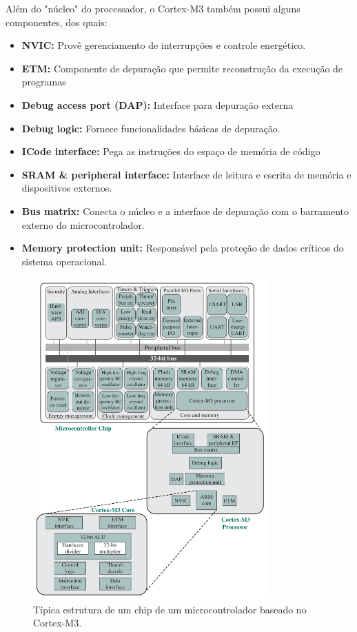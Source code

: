 \documentclass{article}
\begin{document}
Além do "núcleo" do processador, o Cortex-M3 também possui alguns componentes,
dos quais:

\begin{itemize}
    \item \textbf{NVIC:} Provê gerenciamento de interrupções e controle
        energético.
    \item \textbf{ETM:} Componente de depuração que permite reconstrução da
        execução de programas
    \item \textbf{Debug access port (DAP):} Interface para depuração externa
    \item \textbf{Debug logic:} Fornece funcionalidades básicas de depuração.
    \item \textbf{ICode interface:} Pega as instruções do espaço de memória de
        código
    \item \textbf{SRAM \& peripheral interface:} Interface de leitura e escrita
        de memória e dispositivos externos.
    \item \textbf{Bus matrix:} Conecta o núcleo e a interface de depuração com
        o barramento externo do microcontrolador.
    \item \textbf{Memory protection unit:} Responsável pela proteção de dados
        críticos do sistema operacional. 
\end{itemize}

\begin{figure}[h]
    \centering
    \includegraphics[width=0.8\textwidth]{cortex.png}
    \caption{Típica estrutura de um chip de um microcontrolador baseado no
    Cortex-M3.}
\end{figure}
\end{document}
